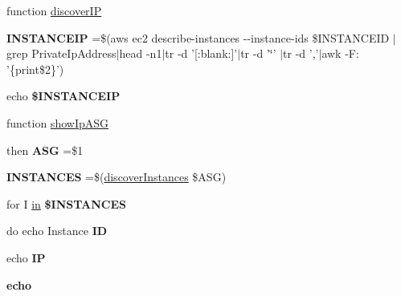 \begin{DoxyCompactItemize}
\item 
function \hyperlink{aws-toolkit_8bash_a39a7f399076870e9c188201b179a8e10}{discover\-I\-P}
\item 
\hypertarget{aws-toolkit_8bash_acce7d982cd32d4081b5dbd3809c54b3c}{{\bfseries I\-N\-S\-T\-A\-N\-C\-E\-I\-P} =\$(aws ec2 describe-\/instances -\/-\/instance-\/ids \$I\-N\-S\-T\-A\-N\-C\-E\-I\-D $\vert$grep Private\-Ip\-Address$\vert$head -\/n1$\vert$tr -\/d '\mbox{[}\-:blank\-:\mbox{]}'$\vert$tr -\/d '\char`\"{}' $\vert$tr -\/d ','$\vert$awk -\/F\-: '\{print\$2\}')}\label{aws-toolkit_8bash_acce7d982cd32d4081b5dbd3809c54b3c}

\item 
\hypertarget{aws-toolkit_8bash_a59332eff39bea0631029d25cb86e882a}{echo {\bfseries \$\-I\-N\-S\-T\-A\-N\-C\-E\-I\-P}}\label{aws-toolkit_8bash_a59332eff39bea0631029d25cb86e882a}

\item 
function \hyperlink{aws-toolkit_8bash_a405eea0fa0871ba579dd1eee3bc19771}{show\-Ip\-A\-S\-G}
\item 
\hypertarget{aws-toolkit_8bash_ae7d9c6051ddd576a99e9f5e8277ba75e}{then {\bfseries A\-S\-G} =\$1}\label{aws-toolkit_8bash_ae7d9c6051ddd576a99e9f5e8277ba75e}

\item 
\hypertarget{aws-toolkit_8bash_a7f98c397795c604766c2561073615e53}{{\bfseries I\-N\-S\-T\-A\-N\-C\-E\-S} =\$(\hyperlink{aws-toolkit_8bash_aa4f4a4f3ee2fcb808a5929a07b047987}{discover\-Instances} \$A\-S\-G)}\label{aws-toolkit_8bash_a7f98c397795c604766c2561073615e53}

\item 
\hypertarget{aws-toolkit_8bash_a633b875aad5109b62818d8ca34650c2d}{for I \hyperlink{aws-toolkit_8bash_ad20b974a24d3991d708fae120975fb17}{in} {\bfseries \$\-I\-N\-S\-T\-A\-N\-C\-E\-S}}\label{aws-toolkit_8bash_a633b875aad5109b62818d8ca34650c2d}

\item 
\hypertarget{aws-toolkit_8bash_a4e17a2e6d0e6dce988d78081d1c5ce80}{do echo Instance {\bfseries I\-D}}\label{aws-toolkit_8bash_a4e17a2e6d0e6dce988d78081d1c5ce80}

\item 
\hypertarget{aws-toolkit_8bash_a1f2cdde138aaa9ce38f5f84ea59def6b}{echo {\bfseries I\-P}}\label{aws-toolkit_8bash_a1f2cdde138aaa9ce38f5f84ea59def6b}

\item 
\hypertarget{aws-toolkit_8bash_ac4fd59c9ee95bff469a7cd55e16f0449}{{\bfseries echo}}\label{aws-toolkit_8bash_ac4fd59c9ee95bff469a7cd55e16f0449}


\end{DoxyCompactItemize}
